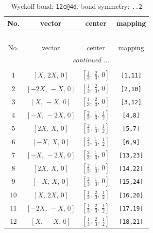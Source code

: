 \documentclass[fleqn,8pt]{jsarticle}
\begin{document}
\renewcommand{\arraystretch}{1.2}
\begin{longtable}{cccc}
\caption{Wyckoff bond: {\tt 12c@4d}, bond symmetry: {\tt ..2}}
 \\
 \hline \hline
No. & vector & center & mapping \\ \hline \endfirsthead

\multicolumn{3}{l}{\tablename\ \thetable{}} \\
 \hline \hline
No. & vector & center & mapping \\ \hline \endhead

 \hline \hline
\multicolumn{3}{r}{\footnotesize\it continued ...} \\ \endfoot

 \hline \hline
\multicolumn{3}{r}{} \\ \endlastfoot

1 & $\left[ X,\, 2 X,\, 0 \right]$ & $\left[ \frac{1}{3},\, \frac{2}{3},\, 0 \right]$ & {\tt [1,11]} \\ \hline
2 & $\left[ - 2 X,\, - X,\, 0 \right]$ & $\left[ \frac{1}{3},\, \frac{2}{3},\, 0 \right]$ & {\tt [2,10]} \\ \hline
3 & $\left[ X,\, - X,\, 0 \right]$ & $\left[ \frac{1}{3},\, \frac{2}{3},\, 0 \right]$ & {\tt [3,12]} \\ \hline
4 & $\left[ - X,\, - 2 X,\, 0 \right]$ & $\left[ \frac{2}{3},\, \frac{1}{3},\, \frac{1}{2} \right]$ & {\tt [4,8]} \\ \hline
5 & $\left[ 2 X,\, X,\, 0 \right]$ & $\left[ \frac{2}{3},\, \frac{1}{3},\, \frac{1}{2} \right]$ & {\tt [5,7]} \\ \hline
6 & $\left[ - X,\, X,\, 0 \right]$ & $\left[ \frac{2}{3},\, \frac{1}{3},\, \frac{1}{2} \right]$ & {\tt [6,9]} \\ \hline
7 & $\left[ - X,\, - 2 X,\, 0 \right]$ & $\left[ \frac{2}{3},\, \frac{1}{3},\, 0 \right]$ & {\tt [13,23]} \\ \hline
8 & $\left[ 2 X,\, X,\, 0 \right]$ & $\left[ \frac{2}{3},\, \frac{1}{3},\, 0 \right]$ & {\tt [14,22]} \\ \hline
9 & $\left[ - X,\, X,\, 0 \right]$ & $\left[ \frac{2}{3},\, \frac{1}{3},\, 0 \right]$ & {\tt [15,24]} \\ \hline
10 & $\left[ X,\, 2 X,\, 0 \right]$ & $\left[ \frac{1}{3},\, \frac{2}{3},\, \frac{1}{2} \right]$ & {\tt [16,20]} \\ \hline
11 & $\left[ - 2 X,\, - X,\, 0 \right]$ & $\left[ \frac{1}{3},\, \frac{2}{3},\, \frac{1}{2} \right]$ & {\tt [17,19]} \\ \hline
12 & $\left[ X,\, - X,\, 0 \right]$ & $\left[ \frac{1}{3},\, \frac{2}{3},\, \frac{1}{2} \right]$ & {\tt [18,21]} \\
\end{longtable}
\end{document}
